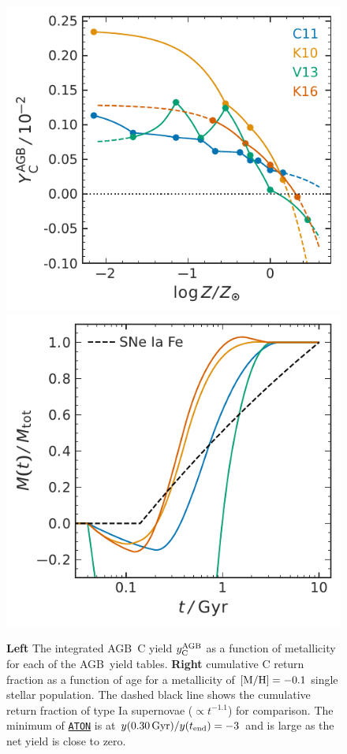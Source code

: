 \documentclass[fleqn,
usenatbib]{mnras}
\newcommand{\aton}{\texttt{\hyperlink{aton}{ATON}}}
\newcommand{\agb}{AGB}
\newcommand{\Ycagb}{{y_{\rm C}^{\rm AGB}}}
\begin{document}
\begin{figure}
    \centering
    \includegraphics{y_agb_vs_z.pdf}
    \includegraphics{y_agb_vs_t.pdf}

    \caption[]{\textbf{Left} The integrated \agb\ C yield $\Ycagb$ as a function of metallicity for each of the \agb\ yield tables.
        \textbf{Right} cumulative C return fraction as a function of age for a metallicity of ${\rm [M/H]}=-0.1$ single stellar population. The dashed black line shows the cumulative return fraction of type Ia supernovae ($\propto t^{-1.1}$) for comparison. The minimum of \aton{} is at $y( 0.30\,{\rm Gyr})/y(t_{\rm end})=-3$ and is large as the net yield is close to zero.
}

    \label{fig:agb-ssp}

\end{figure}
\end{document}
